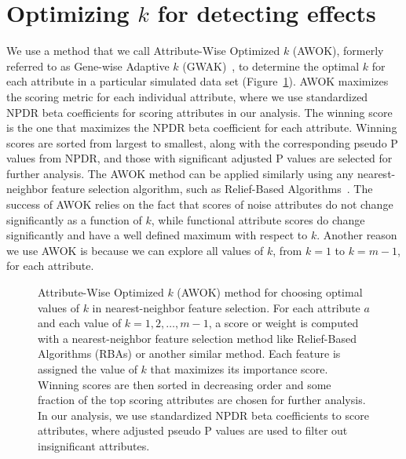 \documentclass[10pt,letterpaper]{article}
\begin{document}
\section{Optimizing \texorpdfstring{$k$}{} for detecting effects}\label{sec:optim-k}

We use a method that we call Attribute-Wise Optimized $k$ (AWOK), formerly referred to as Gene-wise Adaptive $k$ (GWAK)~\cite{mckinney13}, to determine the optimal $k$ for each attribute in a particular simulated data set (Figure~\ref{fig:vwok}). AWOK maximizes the scoring metric for each individual attribute, where we use standardized NPDR beta coefficients for scoring attributes in our analysis. The winning score is the one that maximizes the NPDR beta coefficient for each attribute. Winning scores are sorted from largest to smallest, along with the corresponding pseudo P values from NPDR, and those with significant adjusted P values are selected for further analysis. The AWOK method can be applied similarly using any nearest-neighbor feature selection algorithm, such as Relief-Based Algorithms~\cite{urbanowicz17}. The success of AWOK relies on the fact that scores of noise attributes do not change significantly as a function of $k$, while functional attribute scores do change significantly and have a well defined maximum with respect to $k$. Another reason we use AWOK is because we can explore all values of $k$, from $k=1$ to $k=m-1$, for each attribute.  

\begin{figure}[!hbt]
	\centering
	\caption{Attribute-Wise Optimized $k$ (AWOK) method for choosing optimal values of $k$ in nearest-neighbor feature selection. For each attribute $a$ and each value of $k=1,2,\dots,m-1$, a score or weight is computed with a nearest-neighbor feature selection method like Relief-Based Algorithms (RBAs) or another similar method. Each feature is assigned the value of $k$ that maximizes its importance score. Winning scores are then sorted in decreasing order and some fraction of the top scoring attributes are chosen for further analysis. In our analysis, we use standardized NPDR beta coefficients to score attributes, where adjusted pseudo P values are used to filter out insignificant attributes.}\label{fig:vwok}
\end{figure}
\end{document}
